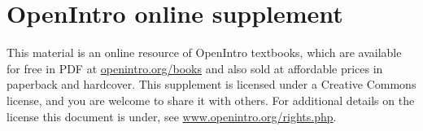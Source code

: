 \documentclass[10pt,openany,oneside]{book}
\date{}
\begin{document}
\section*{OpenIntro online supplement}

This material is an online resource of OpenIntro textbooks, which are available for free in PDF at \href{http://www.openintro.org/books}{openintro.org/books} and also sold at affordable prices in paperback and hardcover. This supplement is licensed under a Creative Commons license, and you are welcome to share it with others. For additional details on the license this document is under, see \href{http://www.openintro.org/rights.php}{www.openintro.org/rights.php}.

%

%
\end{document}
